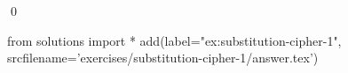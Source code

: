 
\begin{ex} 
  \label{ex:substitution-cipher-1}
  
  \qed
\end{ex} 
\begin{python0}
from solutions import *
add(label="ex:substitution-cipher-1",
    srcfilename='exercises/substitution-cipher-1/answer.tex') 
\end{python0}
